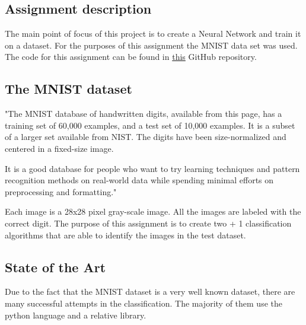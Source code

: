 \subsection*{Assignment description}
The main point of focus of this project is to create a Neural Network and train it on a dataset. For the 
purposes of this assignment the MNIST data set was used. The code for this assignment can be found in 
\href{https://github.com/Billkyriaf/Neural_Networks_1}{this} GitHub repository.

\subsection*{The MNIST dataset}
"The MNIST database of handwritten digits, available from this page, has a training set of 60,000 examples, and
a test set of 10,000 examples. It is a subset of a larger set available from NIST. The digits have been size-normalized 
and centered in a fixed-size image.

It is a good database for people who want to try learning techniques and pattern recognition methods on real-world data
while spending minimal efforts on preprocessing and formatting." \cite{mnist} 

Each image is a 28x28 pixel gray-scale image. All the images are labeled with the correct digit. The purpose of this assignment
is to create two + 1 classification algorithms that are able to identify the images in the test dataset.

\subsection*{State of the Art}

Due to the fact that the MNIST dataset is a very well known dataset, there are many successful attempts in the classification.
The majority of them use the python language and a relative library.
